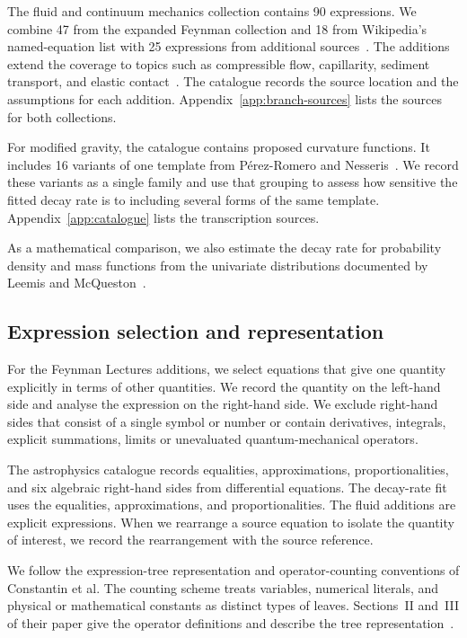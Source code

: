 \documentclass[10pt]{article}
\begin{document}
The fluid and continuum mechanics collection contains 90 expressions. We combine 47 from the expanded Feynman collection and 18 from Wikipedia's named-equation list with 25 expressions from additional sources~\citep{feynman,wikinamed}. The additions extend the coverage to topics such as compressible flow, capillarity, sediment transport, and elastic contact~\citep{nasa-isentropic,washburn1921,ferguson2004,ciulli2022}. The catalogue records the source location and the assumptions for each addition. Appendix~\ref{app:branch-sources} lists the sources for both collections.

For modified gravity, the catalogue contains \nfR{} proposed curvature functions. It includes 16 variants of one template from P\'erez-Romero and Nesseris~\citep{sotiriou2010,perezromero2018}. We record these variants as a single family and use that grouping to assess how sensitive the fitted decay rate is to including several forms of the same template. Appendix~\ref{app:catalogue} lists the transcription sources.

As a mathematical comparison, we also estimate the decay rate for \nLeemis{} probability density and mass functions from the univariate distributions documented by Leemis and McQueston~\citep{leemis2008}.

\subsection{Expression selection and representation}
For the Feynman Lectures additions, we select equations that give one quantity explicitly in terms of other quantities. We record the quantity on the left-hand side and analyse the expression on the right-hand side. We exclude right-hand sides that consist of a single symbol or number or contain derivatives, integrals, explicit summations, limits or unevaluated quantum-mechanical operators.

The astrophysics catalogue records equalities, approximations, proportionalities, and six algebraic right-hand sides from differential equations. The decay-rate fit uses the equalities, approximations, and proportionalities. The fluid additions are explicit expressions. When we rearrange a source equation to isolate the quantity of interest, we record the rearrangement with the source reference.

We follow the expression-tree representation and operator-counting conventions of Constantin et al. The counting scheme treats variables, numerical literals, and physical or mathematical constants as distinct types of leaves. Sections~II and~III of their paper give the operator definitions and describe the tree representation~\citep{constantin2026}.
\end{document}
